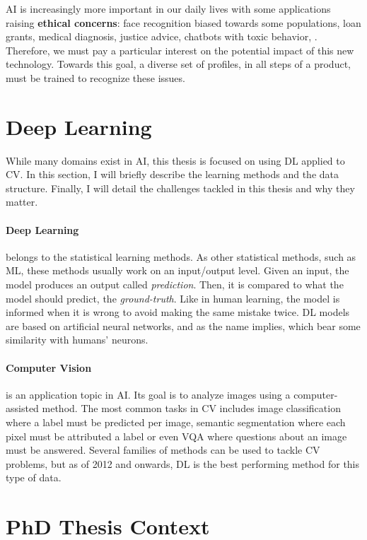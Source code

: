 \ac{AI} is increasingly more important in our daily lives with some applications raising \textbf{ethical
      concerns}: face recognition biased towards some populations, loan grants, medical diagnosis, justice
advice, chatbots with toxic behavior, \etc. Therefore, we must pay a particular interest on the
potential impact of this new technology. Towards this goal, a diverse set of profiles, in all steps
of a product, must be trained to recognize these issues.

\section{Deep Learning}

While many domains exist in \acf{AI}, this thesis is focused on using \acf{DL} applied to \acf{CV}.
In this section, I will briefly describe the learning methods and the data structure.
Finally, I will detail the challenges tackled in this thesis and why they matter.

\paragraph{Deep Learning} belongs to the statistical learning methods. As other statistical methods,
such as \acf{ML}, these methods usually work on an input/output level. Given an input, the model
produces an output called \textit{prediction}. Then, it is compared to what the model should
predict, \ie the \textit{ground-truth}. Like in human learning, the model is informed when it is
wrong to avoid making the same mistake twice. \acf{DL} models are based on artificial neural
networks, and as the name implies, which bear some similarity with humans' neurons.

\paragraph{Computer Vision} is an application topic in \acf{AI}. Its goal is to analyze images using
a computer-assisted method. The most common tasks in \acf{CV} includes image classification where a
label must be predicted per image, semantic segmentation where each pixel must be attributed a label
or even \ac{VQA} where questions about an image must be answered. Several families of methods can be
used to tackle \ac{CV} problems, but as of 2012 and onwards, \acf{DL} is the best performing method
for this type of data.

\section{PhD Thesis Context}

